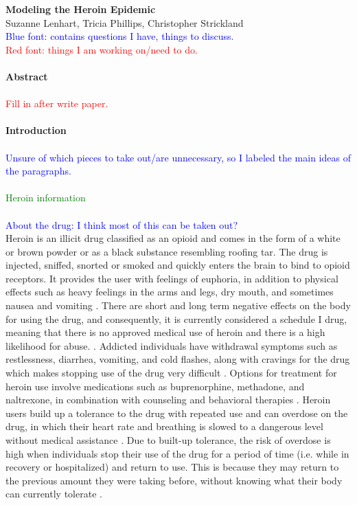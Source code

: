 \documentclass[12pt]{article}
\begin{document}
\textbf{\large{Modeling the Heroin Epidemic}} \\
Suzanne Lenhart, Tricia Phillips, Christopher Strickland \\

\textcolor{blue}{Blue font: contains questions I have, things to discuss.} \\
\textcolor{red}{Red font: things I am working on/need to do.} \\ \\
\textbf{Abstract} \\ \\
\textcolor{red}{Fill in after write paper.} \\ \\
\textbf{Introduction} \\ \\
\textcolor{blue}{Unsure of which pieces to take out/are unnecessary, so I labeled the main ideas of the paragraphs.} \\ \\
\textcolor{green}{Heroin information} \\ \\
\textcolor{blue}{About the drug: I think most of this can be taken out?} \\
Heroin is an illicit drug classified as an opioid and comes in the form of a white or brown powder or as a black substance resembling roofing tar. The drug is injected, sniffed, snorted or smoked and quickly enters the brain to bind to opioid receptors. It provides the user with feelings of euphoria, in addition to physical effects such as heavy feelings in the arms and legs, dry mouth, and sometimes nausea and vomiting \cite{NIH1, NIDA2}. There are short and long term negative effects on the body for using the drug, and consequently, it is currently considered a schedule I drug, meaning that there is no approved medical use of heroin and there is a high likelihood for abuse. \cite{DEA1, NIH1}. Addicted individuals have withdrawal symptoms such as restlessness, diarrhea, vomiting, and cold flashes, along with cravings for the drug which makes stopping use of the drug very difficult \cite{NIH1}. Options for treatment for heroin use involve medications such as buprenorphine, methadone, and naltrexone, in combination with counseling and behavioral therapies \cite{SAMSHA1, NIH1}. Heroin users build up a tolerance to the drug with repeated use and can overdose on the drug, in which their heart rate and breathing is slowed to a dangerous level without medical assistance \cite{NIDA2, NIH1}. Due to built-up tolerance, the risk of overdose is high when individuals stop their use of the drug for a period of time (i.e. while in recovery or hospitalized) and return to use. This is because they may return to the previous amount they were taking before, without knowing what their body can currently tolerate \cite{NIH2}.  
\end{document}
